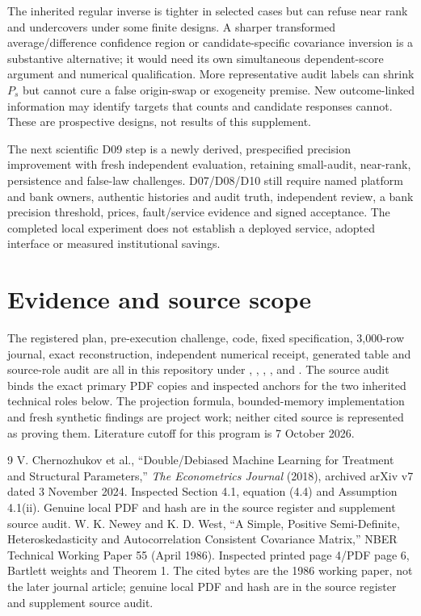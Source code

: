\documentclass[11pt,a4paper]{article}
\begin{document}
The inherited regular inverse is tighter in selected cases but can refuse
near rank and undercovers under some finite designs. A sharper transformed
average/difference confidence region or candidate-specific covariance
inversion is a substantive alternative; it would need its own simultaneous
dependent-score argument and numerical qualification. More representative
audit labels can shrink $P_s$ but cannot cure a false origin-swap or
exogeneity premise. New outcome-linked information may identify targets that
counts and candidate responses cannot. These are prospective designs, not
results of this supplement.

The next scientific D09 step is a newly derived, prespecified precision
improvement with fresh independent evaluation, retaining small-audit,
near-rank, persistence and false-law challenges. D07/D08/D10 still require
named platform and bank owners, authentic histories and audit truth, independent
review, a bank precision threshold, prices, fault/service evidence and signed
acceptance. The completed local experiment does not establish a deployed
service, adopted interface or measured institutional savings.

\section*{Evidence and source scope}

The registered plan, pre-execution challenge, code, fixed specification,
3,000-row journal, exact reconstruction, independent numerical receipt,
generated table and source-role audit are all in this repository under
, , ,
, and . The source audit binds the exact
primary PDF copies and inspected anchors for the two inherited technical
roles below. The projection formula, bounded-memory implementation and fresh
synthetic findings are project work; neither cited source is represented as
proving them. Literature cutoff for this program is 7 October 2026.

\begin{thebibliography}{9}
 V. Chernozhukov et al., ``Double/Debiased Machine Learning
for Treatment and Structural Parameters,'' \emph{The Econometrics Journal}
(2018), archived arXiv v7 dated 3 November 2024. Inspected Section 4.1,
equation (4.4) and Assumption 4.1(ii). Genuine local PDF and hash are in the
source register and supplement source audit.
 W. K. Newey and K. D. West, ``A Simple, Positive
Semi-Definite, Heteroskedasticity and Autocorrelation Consistent Covariance
Matrix,'' NBER Technical Working Paper 55 (April 1986). Inspected printed
page 4/PDF page 6, Bartlett weights and Theorem 1. The cited bytes are the
1986 working paper, not the later journal article; genuine local PDF and hash
are in the source register and supplement source audit.
\end{thebibliography}
\end{document}
